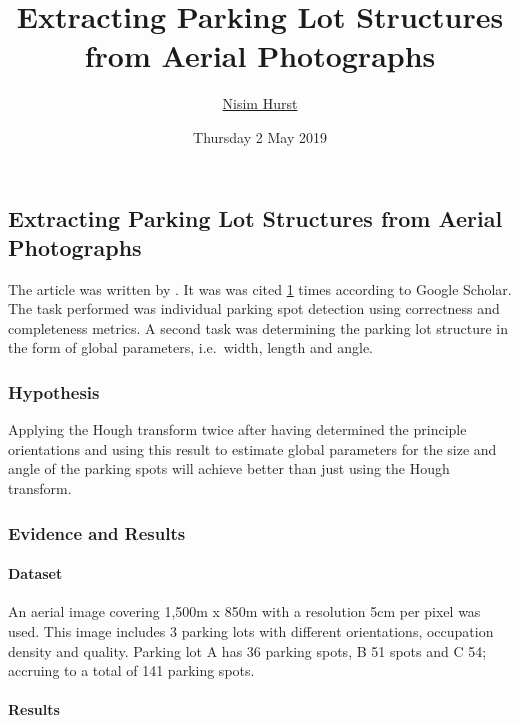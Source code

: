 \documentclass[]{article}
\title{Extracting Parking Lot Structures from Aerial Photographs}
\author{\href{mailto:langheran@gmail.com}{Nisim Hurst}}
\date{Thursday 2 May 2019}
\let\oldparagraph\paragraph
\renewcommand{\paragraph}[1]{\oldparagraph{#1}\mbox{}}
\begin{document}
\maketitle

\label{toc}

\hypertarget{extracting-parking-lot-structures-from-aerial-photographs}{%
\subsection{Extracting Parking Lot Structures from Aerial Photographs}\label{extracting-parking-lot-structures-from-aerial-photographs}}

The article was written by \autocite{Cheng_2014}. It was was cited \href{https://scholar.google.com/scholar?cites=13052058500546908032\&as_sdt=2005\&sciodt=0,5\&hl=en}{1} times according to Google Scholar. The task performed was individual parking spot detection using correctness and completeness metrics. A second task was determining the parking lot structure in the form of global parameters, i.e.~width, length and angle.

\hypertarget{hypothesis}{%
\subsubsection{Hypothesis}\label{hypothesis}}

Applying the Hough transform twice after having determined the principle orientations and using this result to estimate global parameters for the size and angle of the parking spots will achieve better than just using the Hough transform.

\hypertarget{evidence-and-results}{%
\subsubsection{Evidence and Results}\label{evidence-and-results}}

\hypertarget{dataset}{%
\paragraph{Dataset}\label{dataset}}

An aerial image covering 1,500m x 850m with a resolution 5cm per pixel was used. This image includes 3 parking lots with different orientations, occupation density and quality. Parking lot A has 36 parking spots, B 51 spots and C 54; accruing to a total of 141 parking spots.

\hypertarget{results}{%
\paragraph{Results}\label{results}}
\end{document}
